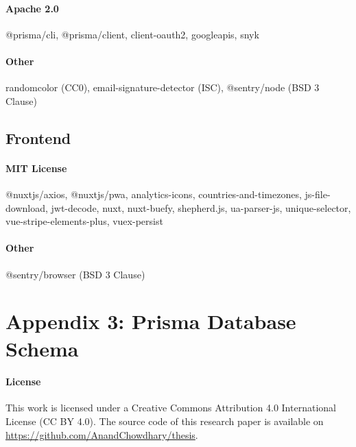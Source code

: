 \documentclass{article}
\begin{document}
\paragraph{Apache 2.0} @prisma/cli, @prisma/client, client-oauth2, googleapis, snyk

\paragraph{Other} randomcolor (CC0), email-signature-detector (ISC), @sentry/node (BSD 3 Clause)

\subsection*{Frontend}

\paragraph{MIT License} @nuxtjs/axios, @nuxtjs/pwa, analytics-icons, countries-and-timezones, js-file-download, jwt-decode, nuxt, nuxt-buefy, shepherd.js, ua-parser-js, unique-selector, vue-stripe-elements-plus, vuex-persist

\paragraph{Other} @sentry/browser (BSD 3 Clause)

\newpage

\section*{Appendix 3: Prisma Database Schema}

\newpage




\paragraph{License} This work is licensed under a Creative Commons Attribution 4.0 International License (CC BY 4.0). The source code of this research paper is available on \url{https://github.com/AnandChowdhary/thesis}.
\end{document}
